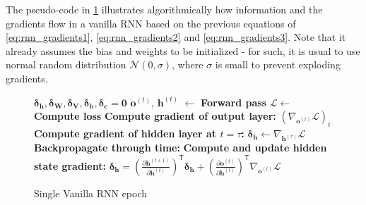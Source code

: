 The pseudo-code in \ref{algo:bptt} illustrates algorithmically how information and the gradients flow in a vanilla RNN based on the previous equations of \eqref{eq:rnn_gradients1}, \eqref{eq:rnn_gradients2} and \eqref{eq:rnn_gradients3}. Note that it already assumes the bias and weights to be initialized - for such, it is usual to use normal random distribution $\mathcal{N}(0, \sigma)$, where $\sigma$ is small to prevent exploding gradients.

\begin{figure}
    \begin{algorithm}[H]
    \caption{ Single Vanilla RNN epoch}
    \label{algo:bptt}
        \begin{algorithmic}
            \State $\boldsymbol{\delta_h},\boldsymbol{\delta_W},\boldsymbol{\delta_V},\boldsymbol{\delta_b},\boldsymbol{\delta_c}  = \mathbf{0}$ 
                \State $\mathbf{o}^{(t)}$, $\mathbf{h}^{(t)}$ $\leftarrow$ \textbf{Forward pass}
            \EndFor
            \State $\mathcal{L}\leftarrow$ \textbf{Compute loss} 
            \State \textbf{Compute gradient of output layer:}
            \State $(\nabla_{ \mathbf{o}^{(t)}} \mathcal{L})_{i} $ 
            \State \textbf{Compute gradient of hidden layer at $t = \tau$:}
            \State $\boldsymbol{\delta_h} \leftarrow \nabla_{\mathbf{h}^{(\tau)}} \mathcal{L} $ 
            \State \textbf{Backpropagate through time:}
                \State \textbf{Compute and update hidden state gradient:}
                \State $\boldsymbol{\delta_h} = \left(\frac{\partial\mathbf{h}^{(t+1)}}{\partial\mathbf{h}^{(t)}}\right)^\mathsf{T}\boldsymbol{\delta_h} + \left(\frac{\partial\mathbf{o}^{(t)}}{\partial\mathbf{h}^{(t)}}\right)^\mathsf{T}\nabla_{ \mathbf{o}^{(t)}} \mathcal{L}$ 


\end{algorithmic}
\end{algorithm}
\end{figure}
